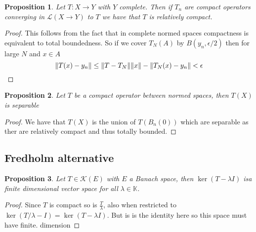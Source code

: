 \documentclass[12pt]{article}
\newtheorem{proposition}{Proposition}
\begin{document}
\begin{proposition}
	Let $T:X\to Y$ with $Y$ complete. Then if $T_n$ are compact operators converging in $\mathcal{L}(X\to Y)$ to $T$ we have that $T$ is relatively compact.
\end{proposition}
\begin{proof}
	This follows from the fact that in complete normed spaces compactness is equivalent to total boundedness. So if we cover $T_N(A)$ by $B(y_n,\epsilon/2)$ then for large $N$ and $x\in A$
	\begin{equation*}
		\norm{T(x)-y_n}\leq \norm{T-T_N}\norm{x}-\norm{T_N(x)-y_n}<\epsilon
	\end{equation*}
\end{proof}
\begin{proposition}
	Let $T$ be a compact operator between normed spaces, then $T(X)$ is separable
\end{proposition}
\begin{proof}
	We have that $T(X)$ is the union of $T(B_n(0))$ which are separable as ther are relatively compact and thus totally bounded.
\end{proof}
\subsection{Fredholm alternative}
\begin{proposition}
	Let $T\in\mathcal{K}(E)$ with $E$ a Banach space, then $\ker(T-\lambda I)$ isa finite dimensional vector space for all $\lambda\in\mathbb{K}$.
\end{proposition}
\begin{proof}
	Since $T$ is compact so is $\frac{T}{\lambda}$, also when restricted to $\ker(T/\lambda-I)=\ker(T-\lambda I)$. But is is the identity here so this space must have finite. dimension
\end{proof}
\end{document}

